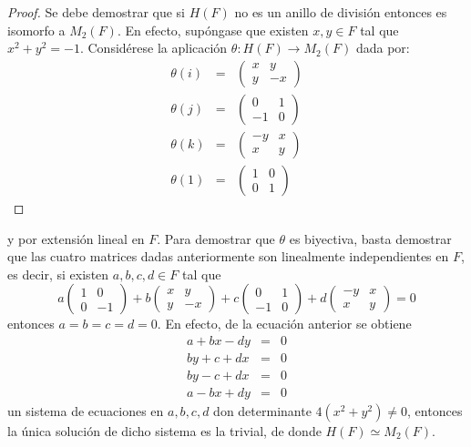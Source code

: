 \begin{proof}
Se debe demostrar que si $H(F)$ no es un anillo de división entonces es isomorfo a $M_2(F)$. En efecto, supóngase que existen $x,y \in F$ tal que $x^2 + y^2 = -1$. Considérese la aplicación $\theta \colon H(F) \to M_2(F)$ dada por:
\begin{eqnarray*}
\theta(i) &=& \begin{pmatrix}
x & y\\
y & -x
\end{pmatrix}\\
\theta(j) &=& \begin{pmatrix}
0 & 1\\
-1 & 0
\end{pmatrix}\\
\theta(k) &=& \begin{pmatrix}
-y & x \\
x & y 
\end{pmatrix} \\
\theta(1) &=& \begin{pmatrix}
1 & 0 \\
0 & 1
\end{pmatrix}
\end{eqnarray*}
\end{proof}
y por extensión lineal en $F$.
Para demostrar que $\theta$ es biyectiva, basta demostrar que las cuatro matrices dadas anteriormente son linealmente independientes en $F$, es decir, si existen $a, b, c, d \in F$ tal que 
\begin{equation*}
a\begin{pmatrix}
1 & 0\\
0 & -1
\end{pmatrix} + b\begin{pmatrix}
x & y \\
y & -x
\end{pmatrix} + c\begin{pmatrix}
0 & 1 \\
-1 & 0
\end{pmatrix} + d\begin{pmatrix}
-y & x\\
x & y
\end{pmatrix} = 0
\end{equation*}
entonces $a = b = c = d = 0$. En efecto, de la ecuación anterior se obtiene
\begin{eqnarray*}
a + bx - dy &=& 0\\
by + c + dx &=& 0 \\
by -c + dx &=& 0 \\
a -bx + dy &=& 0
\end{eqnarray*}
un sistema de ecuaciones en $a, b, c,d$ don determinante $4(x^2 + y^2) \neq 0$, entonces la única solución de dicho sistema es la trivial, de donde $H(F) \simeq M_2(F)$.


